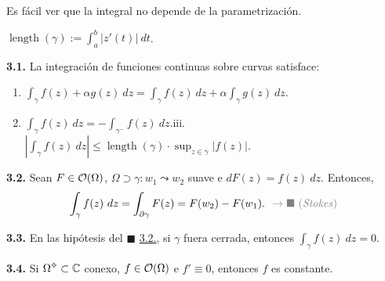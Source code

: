 \begin{note}
    Es fácil ver que la integral no depende de la parametrización. 
\end{note}

\begin{definition}
    \centering
    \(\displaystyle \operatorname{length}(\gamma):= \int_a^b |z'(t) | \ dt\). 
\end{definition}

\begin{proposition}
    \textbf{3.1.} La integración de funciones continuas sobre curvas satisface:%
    \vspace{-0.3cm}
    \begin{enumerate}[label = \roman*., left = 0.35cm]
        \item \(\displaystyle \int_\gamma f(z) + \alpha g(z) \ dz = \int_\gamma f(z) \ dz + \alpha \int_\gamma g(z) \ dz \). 
        \item \(\displaystyle \int_\gamma f(z) \ dz = - \int_{\gamma^-} f(z) \ dz\).\hfill iii. \ \(\displaystyle \left|\int_\gamma f(z) \ dz\right| \leq  \operatorname{length}(\gamma) \cdot \sup_{z \in \gamma } |f(z)|\). 
    \end{enumerate}
\end{proposition}

\hypertarget{thm33}{}

\begin{theorem}
    \textbf{3.2.} Sean \(F \in \mathcal{O}(\Omega)\), \( \Omega \supset \gamma : w_1 \leadsto w_2\) suave e \(dF(z)=  f(z) \ dz\). Entonces, 
    \[\int_\gamma f(z) \ dz = \int_{\partial \gamma} F(z) = F(w_2) - F(w_1). \textcolor{gray}{\ \ \rightarrow  \blacksquare \ \text{(\emph{Stokes})}}\]
\end{theorem}

\vspace{-0.5cm}
\hypertarget{coro133}{}
\begin{corollary}
    \textbf{3.3.} En las hipótesis del \(\blacksquare\) \hyperlink{thm33}{3.2.}, si \(\gamma\) fuera cerrada, entonces \(\displaystyle \int_\gamma f(z) \ dz = 0 \).
\end{corollary}

\hypertarget{coro134}{}
\begin{corollary}
    \textbf{3.4.} Si \(\Omega\ab\subset \C\) conexo, \(f\in \mathcal{O}(\Omega)\)  e \(f'\equiv 0\), entonces \(f\) es constante. 
\end{corollary}

